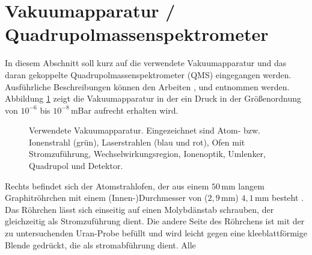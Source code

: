 \section{Vakuumapparatur /
Quadrupolmassenspektrometer}\label{sec:vakuumapparatur_qms}
In diesem Abschnitt soll kurz auf die verwendete Vakuumapparatur und das daran
gekoppelte Quadrupolmassenspektrometer (QMS) eingegangen werden. Ausführliche
Beschreibungen können den Arbeiten
\cite{blaum:1997:diplomarbeit},\cite{geppert:2005:dissertation} und \cite{schumann:2005:dissertation}
entnommen werden. Abbildung \ref{fig:vakuumapparatur_foto} zeigt die
Vakuumapparatur in der ein Druck in der Größenordnung von $10^{-6}$ bis
$10^{-8}\,$mBar aufrecht erhalten wird.\par
\begin{figure}[h]
 	\centering
	\caption[Vakuumapparatur]{Verwendete Vakuumapparatur. Eingezeichnet sind Atom-
	bzw. Ionenstrahl (grün), Laserstrahlen (blau und rot), Ofen mit Stromzuführung,
	Wechselwirkungsregion, Ionenoptik, Umlenker, Quadrupol und Detektor.}
	\label{fig:vakuumapparatur_foto}
\end{figure}
Rechts befindet sich der Atomstrahlofen, der aus einem $50\,$mm langem
Graphitröhrchen mit einem (Innen-)Durchmesser von ($2,9\,$mm) $4,1\,$mm besteht \cite{raeder:2006:diplomarbeit}. Das Röhrchen lässt sich einseitig auf einen
Molybdänstab schrauben, der gleichzeitig als Stromzuführung dient. Die andere
Seite des Röhrchens ist mit der zu untersuchenden Uran-Probe befüllt und wird
leicht gegen eine kleeblattförmige Blende gedrückt, die als stromabführung dient. Alle
